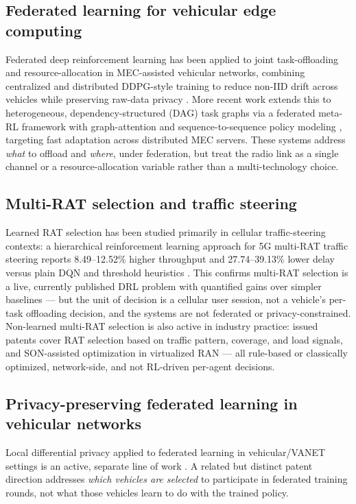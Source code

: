 \documentclass[journal,10pt,twocolumn]{IEEEtran}
\begin{document}
\subsection{Federated learning for vehicular edge computing}
Federated deep reinforcement learning has been applied to joint task-offloading and
resource-allocation in MEC-assisted vehicular networks, combining centralized and distributed
DDPG-style training to reduce non-IID drift across vehicles while preserving raw-data privacy
\cite{jnca2024fedoffload}. More recent work extends this to heterogeneous, dependency-structured
(DAG) task graphs via a federated meta-RL framework with graph-attention and sequence-to-sequence
policy modeling \cite{fedmags2026}, targeting fast adaptation across distributed MEC servers. These
systems address \emph{what} to offload and \emph{where}, under federation, but treat the radio link
as a single channel or a resource-allocation variable rather than a multi-technology choice.

\subsection{Multi-RAT selection and traffic steering}
Learned RAT selection has been studied primarily in cellular traffic-steering contexts: a
hierarchical reinforcement learning approach for 5G multi-RAT traffic steering reports 8.49--12.52\%
higher throughput and 27.74--39.13\% lower delay versus plain DQN and threshold heuristics
\cite{hrlmultirat2024}. This confirms multi-RAT selection is a live, currently published DRL
problem with quantified gains over simpler baselines --- but the unit of decision is a cellular
user session, not a vehicle's per-task offloading decision, and the systems are not federated or
privacy-constrained. Non-learned multi-RAT selection is also active in industry practice: issued
patents \cite{uspatent_verizon,uspatent_son} cover RAT selection based on traffic pattern, coverage,
and load signals, and SON-assisted optimization in virtualized RAN --- all rule-based or
classically optimized, network-side, and not RL-driven per-agent decisions.

\subsection{Privacy-preserving federated learning in vehicular networks}
Local differential privacy applied to federated learning in vehicular/VANET settings is an active,
separate line of work \cite{ldpvanet2023}. A related but distinct patent direction
\cite{uspatent_vehiclefl} addresses \emph{which vehicles are selected} to participate in federated
training rounds, not what those vehicles learn to do with the trained policy.
\end{document}
